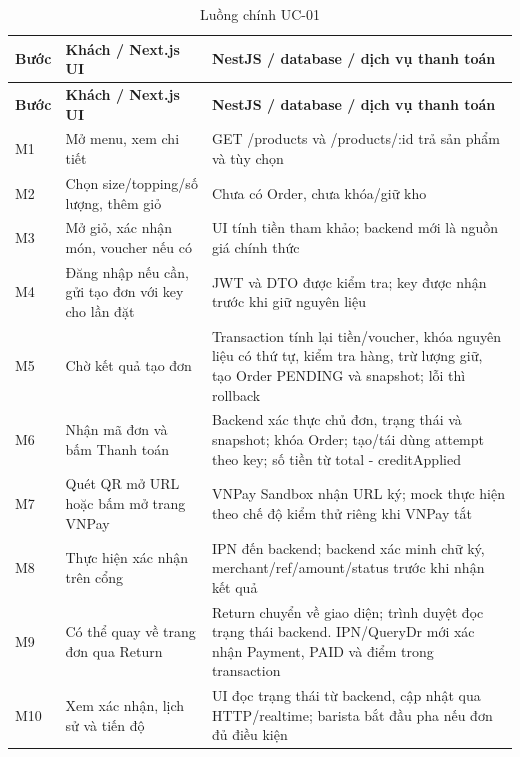 \begin{longtable}{|>{\raggedright\arraybackslash}p{}|>{\raggedright\arraybackslash}p{}|>{\raggedright\arraybackslash}p{}|}
\caption{Luồng chính UC-01}\\\hline
\textbf{Bước} & \textbf{Khách / Next.js UI} & \textbf{NestJS / database / dịch vụ thanh toán} \\ \hline
\endfirsthead
\hline
\textbf{Bước} & \textbf{Khách / Next.js UI} & \textbf{NestJS / database / dịch vụ thanh toán} \\ \hline
\endhead
M1 & Mở menu, xem chi tiết & GET /products và /products/:id trả sản phẩm và tùy chọn \\ \hline
M2 & Chọn size/topping/số lượng, thêm giỏ & Chưa có Order, chưa khóa/giữ kho \\ \hline
M3 & Mở giỏ, xác nhận món, voucher nếu có & UI tính tiền tham khảo; backend mới là nguồn giá chính thức \\ \hline
M4 & Đăng nhập nếu cần, gửi tạo đơn với key cho lần đặt & JWT và DTO được kiểm tra; key được nhận trước khi giữ nguyên liệu \\ \hline
M5 & Chờ kết quả tạo đơn & Transaction tính lại tiền/voucher, khóa nguyên liệu có thứ tự, kiểm tra hàng, trừ lượng giữ, tạo Order PENDING và snapshot; lỗi thì rollback \\ \hline
M6 & Nhận mã đơn và bấm Thanh toán & Backend xác thực chủ đơn, trạng thái và snapshot; khóa Order; tạo/tái dùng attempt theo key; số tiền từ total - creditApplied \\ \hline
M7 & Quét QR mở URL hoặc bấm mở trang VNPay & VNPay Sandbox nhận URL ký; mock thực hiện theo chế độ kiểm thử riêng khi VNPay tắt \\ \hline
M8 & Thực hiện xác nhận trên cổng & IPN đến backend; backend xác minh chữ ký, merchant/ref/amount/status trước khi nhận kết quả \\ \hline
M9 & Có thể quay về trang đơn qua Return & Return chuyển về giao diện; trình duyệt đọc trạng thái backend. IPN/QueryDr mới xác nhận Payment, PAID và điểm trong transaction \\ \hline
M10 & Xem xác nhận, lịch sử và tiến độ & UI đọc trạng thái từ backend, cập nhật qua HTTP/realtime; barista bắt đầu pha nếu đơn đủ điều kiện \\ \hline
\end{longtable}
\endgroup
\begingroup\footnotesize\setlength{\tabcolsep}{3pt}
